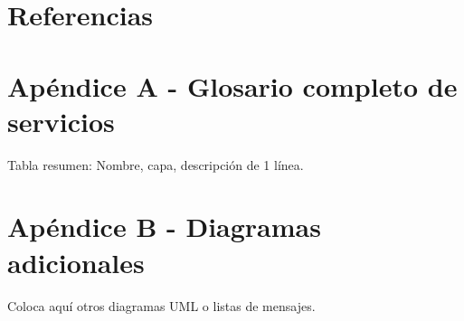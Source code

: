 \documentclass[11pt,a4paper]{article}
\begin{document}
\section{Referencias}

% 

\appendix
\section{Apéndice A - Glosario completo de servicios}
Tabla resumen: Nombre, capa, descripción de 1 línea.

\section{Apéndice B - Diagramas adicionales}
Coloca aquí otros diagramas UML o listas de mensajes.
\end{document}
